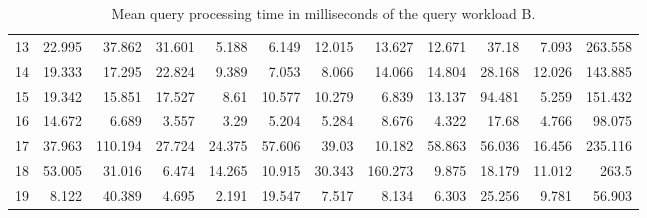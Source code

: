 \documentclass[conference]{IEEEtran}
\begin{document}
\begin{table}[!th]
{\begin{tabular}{|c|r|r|r|r|r|r|r|r|r|r|r|}
			13 & 22.995 & 37.862  & 31.601 & 5.188  & 6.149  & 12.015 & 13.627  & 12.671 & 37.18   & 7.093   & 263.558 \\
			14 & 19.333 & 17.295  & 22.824 & 9.389  & 7.053  & 8.066  & 14.066  & 14.804 & 28.168  & 12.026  & 143.885 \\
			15 & 19.342 & 15.851  & 17.527 & 8.61   & 10.577 & 10.279 & 6.839   & 13.137 & 94.481  & 5.259   & 151.432 \\
			16 & 14.672 & 6.689   & 3.557  & 3.29   & 5.204  & 5.284  & 8.676   & 4.322  & 17.68   & 4.766   & 98.075  \\
			17 & 37.963 & 110.194 & 27.724 & 24.375 & 57.606 & 39.03  & 10.182  & 58.863 & 56.036  & 16.456  & 235.116 \\
			18 & 53.005 & 31.016  & 6.474  & 14.265 & 10.915 & 30.343 & 160.273 & 9.875  & 18.179  & 11.012  & 263.5   \\
			19 & 8.122  & 40.389  & 4.695  & 2.191  & 19.547 & 7.517  & 8.134   & 6.303  & 25.256  & 9.781   & 56.903  \\ \hline
		\end{tabular}%
	}
	\caption{Mean query processing time in milliseconds of the query workload B.}
	\label{tab:benchmark_B}
\end{table}

\end{document}
